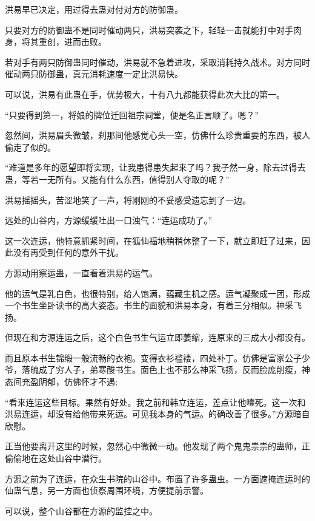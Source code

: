 
\begin{this_body}

洪易早已决定，用过得去蛊对付对方的防御蛊。

只要对方的防御蛊不是同时催动两只，洪易突袭之下，轻轻一击就能打中对手肉身，将其重创，进而击败。

若对手有两只防御蛊同时催动，洪易就不急着进攻，采取消耗持久战术。对方同时催动两只防御蛊，真元消耗速度一定比洪易快。

可以说，洪易有此蛊在手，优势极大，十有八九都能获得此次大比的第一。

“只要得到第一，将娘的牌位迁回祖宗祠堂，便是名正言顺了。嗯？”

忽然间，洪易眉头微皱，刹那间他感觉心头一空，仿佛什么珍贵重要的东西，被人偷走了似的。

“难道是多年的愿望即将实现，让我患得患失起来了吗？我孑然一身，除去过得去蛊，等若一无所有。又能有什么东西，值得别人夺取的呢？”

洪易摇摇头，苦涩地笑了一声，将刚刚的不妥感受遗忘到了一边。

远处的山谷内，方源缓缓吐出一口浊气：“连运成功了。”

这一次连运，他特意抓紧时间，在狐仙福地稍稍休整了一下，就立即赶了过来，因此没有再受到任何的意外干扰。

方源动用察运蛊，一直看着洪易的运气。

他的运气是乳白色，也很特别，给人饱满，蕴藏生机之感。运气凝聚成一团，形成一个书生坐卧读书的高大姿态。书生的面貌和洪易本身，有着三分相似。神采飞扬。

但现在和方源连运之后，这个白色书生气运立即萎缩，连原来的三成大小都没有。

而且原本书生锦缎一般流畅的衣袍。变得衣衫褴褛，四处补丁。仿佛是富家公子少爷，落魄成了穷人子，弟寒酸书生。面色上也不那么神采飞扬，反而脸庞削瘦，神态间充盈阴郁，仿佛怀才不遇;

“看来连运这些目标。果然有好处。我之前和韩立连运，差点让他噎死。这一次和洪易连运，却没有给他带来死运。可见我本身的气运。的确改善了很多。”方源暗自欣慰。

正当他要离开这里的时候，忽然心中微微一动。他发现了两个鬼鬼祟祟的蛊师，正偷偷地在这处山谷中潜行。

方源之前为了连运，在众生书院的山谷中。布置了许多蛊虫。一方面遮掩连运时的仙蛊气息，另一方面也侦察周围环境，方便提前示警。

可以说，整个山谷都在方源的监控之中。


\end{this_body}
